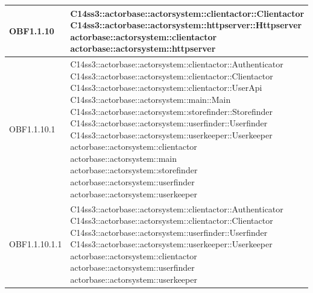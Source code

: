 \documentclass{scalatekids-article}
\begin{document}
\begin{longtable}[H]{|p{4.5cm}|p{13cm}|}
\hline
OBF1.1.10 & \multiLineCell[t]{C14ss3::actorbase::actorsystem::clientactor::Clientactor\\C14ss3::actorbase::actorsystem::httpserver::Httpserver\\actorbase::actorsystem::clientactor\\actorbase::actorsystem::httpserver\\}\\
\hline
OBF1.1.10.1 & \multiLineCell[t]{C14ss3::actorbase::actorsystem::clientactor::Authenticator\\C14ss3::actorbase::actorsystem::clientactor::Clientactor\\C14ss3::actorbase::actorsystem::clientactor::UserApi\\C14ss3::actorbase::actorsystem::main::Main\\C14ss3::actorbase::actorsystem::storefinder::Storefinder\\C14ss3::actorbase::actorsystem::userfinder::Userfinder\\C14ss3::actorbase::actorsystem::userkeeper::Userkeeper\\actorbase::actorsystem::clientactor\\actorbase::actorsystem::main\\actorbase::actorsystem::storefinder\\actorbase::actorsystem::userfinder\\actorbase::actorsystem::userkeeper\\}\\
\hline
OBF1.1.10.1.1 & \multiLineCell[t]{C14ss3::actorbase::actorsystem::clientactor::Authenticator\\C14ss3::actorbase::actorsystem::clientactor::Clientactor\\C14ss3::actorbase::actorsystem::userfinder::Userfinder\\C14ss3::actorbase::actorsystem::userkeeper::Userkeeper\\actorbase::actorsystem::clientactor\\actorbase::actorsystem::userfinder\\actorbase::actorsystem::userkeeper\\}\\
\hline

\end{longtable}
\end{document}
